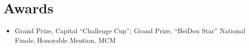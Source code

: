 \documentclass[10pt, letterpaper]{article}
\begin{document}
\section{Awards}
\begin{itemize}[leftmargin=1.3em]
    \item Grand Prize, Capital ``Challenge Cup''; Grand Prize, ``BeiDou Star'' National Finals; Honorable Mention, MCM
\end{itemize}
\end{document}
